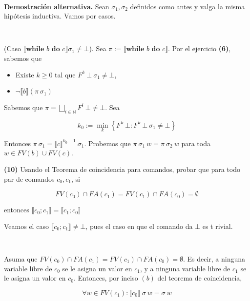 \documentclass[article, 12pt]{article}
\begin{document}
~

\textbf{Demostración alternativa.} Sean $\sigma_1, \sigma_2$ definidos como
antes y valga la misma hipótesis inductiva. Vamos por casos.

~

(Caso $\llbracket \textbf{while } b \textbf{ do } c\rrbracket \sigma_1 \neq \bot
$). Sea $\pi := \llbracket \textbf{while } b \textbf{ do } c\rrbracket$.
Por el ejercicio \textbf{(6)}, sabemos que 

\begin{itemize}
  \item Existe $k \geq 0$ tal que $F^k ~ \bot
~ \sigma_1 \neq \bot $, 
  \item $\neg\llbracket b \rrbracket(\pi ~ \sigma_1)$
\end{itemize}

Sabemos que $\pi = \bigsqcup_{i \in \mathbb{N}} F^i ~ \bot \neq \bot $. Sea 

\begin{equation*}
  k_0 := \min_{k} \left\{ F^k ~ \bot : F^k ~ \bot ~ \sigma_1 \neq \bot  \right\} 
\end{equation*}

Entonces $\pi ~ \sigma_1 = \llbracket c \rrbracket^{k_0-1} ~ \sigma_1$. Probemos
que $\pi ~ \sigma_1 ~ w = \pi ~ \sigma_2 ~ w$ para toda $w \in FV(b) \cup
FV(c)$. 
~
\pagebreak 

\begin{myframe}
\textbf{(10)} Usando el Teorema de coincidencia para comandos, probar que para
todo par de comandos $c_0, c_1$, si 

\begin{equation*}
  FV(c_0) \cap FA(c_1) = FV(c_1) \cap FA(c_0) = \emptyset
\end{equation*}

entonces $\llbracket c_0;c_1 \rrbracket = \llbracket c_1;c_0 \rrbracket$
\end{myframe}


Veamos el caso $\llbracket c_0;c_1\rrbracket\neq \bot $, pues el caso en que el
comando da $\bot $ es t rivial.

~ 

Asuma que $FV(c_0) \cap FA(c_1) = FV(c_1) \cap FA(c_0) = \emptyset$. Es decir, a
ninguna variable libre de $c_0$ se le asigna un valor en $c_1$, y a ninguna
variable libre de $c_1$ se le asigna un valor en $c_0$. Entonces, por inciso
$(b)$ del teorema de coincidencia,

\begin{equation*}
  \forall  w \in FV(c_1) : \llbracket c_0 \rrbracket ~ \sigma ~ w = \sigma ~ w
\end{equation*}
\end{document}
